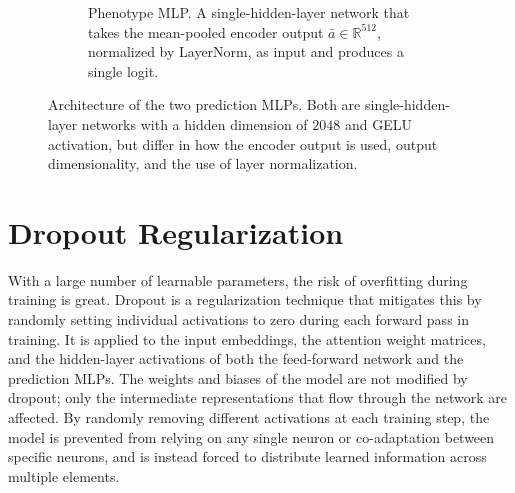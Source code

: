 \begin{figure}[h]
\begin{subfigure}[t]{0.48\textwidth}
        \caption{Phenotype MLP. A single-hidden-layer network that takes the mean-pooled encoder output $\bar{a} \in \mathbb{R}^{512}$, normalized by LayerNorm, as input and produces a single logit.}
        \label{fig:pheno_mlp}
    \end{subfigure}
    \caption{Architecture of the two prediction MLPs. Both are single-hidden-layer networks with a hidden dimension of $2048$ and GELU activation, but differ in how the encoder output is used, output dimensionality, and the use of layer normalization.}
    \label{fig:prediction_mlps}
\end{figure}

\section{Dropout Regularization} \label{sec:dropout}
With a large number of learnable parameters, the risk of overfitting during
training is great. Dropout is a regularization technique that mitigates this
by randomly setting individual activations to zero during each forward pass
in training. It is applied to the input embeddings, the attention weight
matrices, and the hidden-layer activations of both the feed-forward network
and the prediction MLPs. The weights and biases of the model are not
modified by dropout; only the intermediate representations that flow through
the network are affected. By randomly removing different activations at each
training step, the model is prevented from relying on any single neuron or
co-adaptation between specific neurons, and is instead forced to distribute
learned information across multiple elements.

